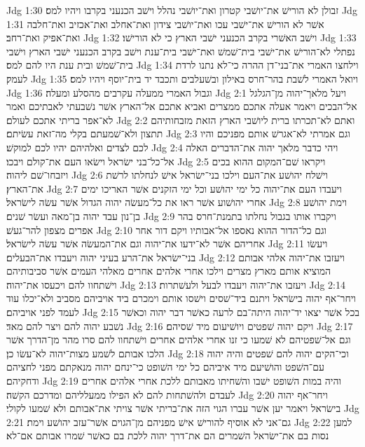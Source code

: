 Jdg 1:30  זבולן לא הורישׁ את־יושׁבי קטרון ואת־יושׁבי נהלל וישׁב הכנעני בקרבו ויהיו למס׃
Jdg 1:31  אשׁר לא הורישׁ את־ישׁבי עכו ואת־יושׁבי צידון ואת־אחלב ואת־אכזיב ואת־חלבה ואת־אפיק ואת־רחב׃
Jdg 1:32  וישׁב האשׁרי בקרב הכנעני ישׁבי הארץ כי לא הורישׁו׃
Jdg 1:33  נפתלי לא־הורישׁ את־ישׁבי בית־שׁמשׁ ואת־ישׁבי בית־ענת וישׁב בקרב הכנעני ישׁבי הארץ וישׁבי בית־שׁמשׁ ובית ענת היו להם למס׃
Jdg 1:34  וילחצו האמרי את־בני־דן ההרה כי־לא נתנו לרדת לעמק׃
Jdg 1:35  ויואל האמרי לשׁבת בהר־חרס באילון ובשׁעלבים ותכבד יד בית־יוסף ויהיו למס׃
Jdg 1:36  וגבול האמרי ממעלה עקרבים מהסלע ומעלה׃
Jdg 2:1  ויעל מלאך־יהוה מן־הגלגל אל־הבכים ויאמר אעלה אתכם ממצרים ואביא אתכם אל־הארץ אשׁר נשׁבעתי לאבתיכם ואמר לא־אפר בריתי אתכם לעולם׃
Jdg 2:2  ואתם לא־תכרתו ברית ליושׁבי הארץ הזאת מזבחותיהם תתצון ולא־שׁמעתם בקלי מה־זאת עשׂיתם׃
Jdg 2:3  וגם אמרתי לא־אגרשׁ אותם מפניכם והיו לכם לצדים ואלהיהם יהיו לכם למוקשׁ׃
Jdg 2:4  ויהי כדבר מלאך יהוה את־הדברים האלה אל־כל־בני ישׂראל וישׂאו העם את־קולם ויבכו׃
Jdg 2:5  ויקראו שׁם־המקום ההוא בכים ויזבחו־שׁם ליהוה׃
Jdg 2:6  וישׁלח יהושׁע את־העם וילכו בני־ישׂראל אישׁ לנחלתו לרשׁת את־הארץ׃
Jdg 2:7  ויעבדו העם את־יהוה כל ימי יהושׁע וכל ימי הזקנים אשׁר האריכו ימים אחרי יהושׁוע אשׁר ראו את כל־מעשׂה יהוה הגדול אשׁר עשׂה לישׂראל׃
Jdg 2:8  וימת יהושׁע בן־נון עבד יהוה בן־מאה ועשׂר שׁנים׃
Jdg 2:9  ויקברו אותו בגבול נחלתו בתמנת־חרס בהר אפרים מצפון להר־געשׁ׃
Jdg 2:10  וגם כל־הדור ההוא נאספו אל־אבותיו ויקם דור אחר אחריהם אשׁר לא־ידעו את־יהוה וגם את־המעשׂה אשׁר עשׂה לישׂראל׃
Jdg 2:11  ויעשׂו בני־ישׂראל את־הרע בעיני יהוה ויעבדו את־הבעלים׃
Jdg 2:12  ויעזבו את־יהוה אלהי אבותם המוציא אותם מארץ מצרים וילכו אחרי אלהים אחרים מאלהי העמים אשׁר סביבותיהם וישׁתחוו להם ויכעסו את־יהוה׃
Jdg 2:13  ויעזבו את־יהוה ויעבדו לבעל ולעשׁתרות׃
Jdg 2:14  ויחר־אף יהוה בישׂראל ויתנם ביד־שׁסים וישׁסו אותם וימכרם ביד אויביהם מסביב ולא־יכלו עוד לעמד לפני אויביהם׃
Jdg 2:15  בכל אשׁר יצאו יד־יהוה היתה־בם לרעה כאשׁר דבר יהוה וכאשׁר נשׁבע יהוה להם ויצר להם מאד׃
Jdg 2:16  ויקם יהוה שׁפטים ויושׁיעום מיד שׁסיהם׃
Jdg 2:17  וגם אל־שׁפטיהם לא שׁמעו כי זנו אחרי אלהים אחרים וישׁתחוו להם סרו מהר מן־הדרך אשׁר הלכו אבותם לשׁמע מצות־יהוה לא־עשׂו כן׃
Jdg 2:18  וכי־הקים יהוה להם שׁפטים והיה יהוה עם־השׁפט והושׁיעם מיד איביהם כל ימי השׁופט כי־ינחם יהוה מנאקתם מפני לחציהם ודחקיהם׃
Jdg 2:19  והיה במות השׁופט ישׁבו והשׁחיתו מאבותם ללכת אחרי אלהים אחרים לעבדם ולהשׁתחות להם לא הפילו ממעלליהם ומדרכם הקשׁה׃
Jdg 2:20  ויחר־אף יהוה בישׂראל ויאמר יען אשׁר עברו הגוי הזה את־בריתי אשׁר צויתי את־אבותם ולא שׁמעו לקולי׃
Jdg 2:21  גם־אני לא אוסיף להורישׁ אישׁ מפניהם מן־הגוים אשׁר־עזב יהושׁע וימת׃
Jdg 2:22  למען נסות בם את־ישׂראל השׁמרים הם את־דרך יהוה ללכת בם כאשׁר שׁמרו אבותם אם־לא׃
